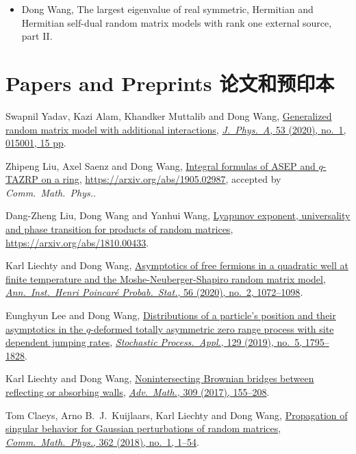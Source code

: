 \documentclass[12pt,a4paper]{article}
\begin{document}
\begin{itemize}
\item
  Dong Wang, The largest eigenvalue of real symmetric, Hermitian and Hermitian self-dual random matrix models with rank one external source, part II.
\end{itemize}

\section*{Papers and Preprints 论文和预印本}

\begin{etaremune}
\item
  Swapnil Yadav, Kazi Alam, Khandker Muttalib and Dong Wang, \href{https://arxiv.org/abs/1908.03726}{Generalized random matrix model with additional interactions}, \href{https://dx.doi.org/10.1088/1751-8121/ab56e0}{\textit{J.\ Phys.\ A}, 53 (2020), no.\ 1, 015001, 15 pp}.
\item
  Zhipeng Liu, Axel Saenz and Dong Wang, \href{https://arxiv.org/abs/1905.02987}{Integral formulas of ASEP and $q$-TAZRP on a ring}, \url{https://arxiv.org/abs/1905.02987}, accepted by \textit{Comm.\ Math.\ Phys.}.
\item
  Dang-Zheng Liu, Dong Wang and Yanhui Wang, \href{https://arxiv.org/abs/1810.00433}{Lyapunov exponent, universality and phase transition for products of random matrices}, \url{https://arxiv.org/abs/1810.00433}.
\item
  Karl Liechty and Dong Wang, \href{https://arxiv.org/abs/1706.06653}{Asymptotics of free fermions in a quadratic well at finite temperature and the Moshe-Neuberger-Shapiro random matrix model}, \href{https://doi.org/10.1214/19-AIHP994}{\textit{Ann.\ Inst.\ Henri Poincar\'{e} Probab.\ Stat.}, 56 (2020), no.\ 2, 1072--1098}.
\item
  Eunghyun Lee and Dong Wang, \href{https://arxiv.org/abs/1703.08839}{Distributions of a particle's position and their asymptotics in the $q$-deformed totally asymmetric zero range process with site dependent jumping rates}, \href{https://doi.org/10.1016/j.spa.2018.06.005}{\textit{Stochastic Process.\ Appl.}, 129 (2019), no.\ 5, 1795--1828}.
\item
  Karl Liechty and Dong Wang, \href{http://arxiv.org/abs/1608.08712}{Nonintersecting Brownian bridges between reflecting or absorbing walls}, \href{https://doi.org/10.1016/j.aim.2016.10.024}{\textit{Adv.\ Math.}, 309 (2017), 155--208}.
\item
  Tom Claeys, Arno B.~J.~Kuijlaars, Karl Liechty and Dong Wang, \href{http://arxiv.org/abs/1608.05870}{Propagation of singular behavior for Gaussian perturbations of random matrices}, \href{https://doi.org/10.1007/s00220-018-3195-8}{\textit{Comm.\ Math.\ Phys.}, 362 (2018), no.\ 1, 1--54}.

\end{etaremune}
\end{document}
